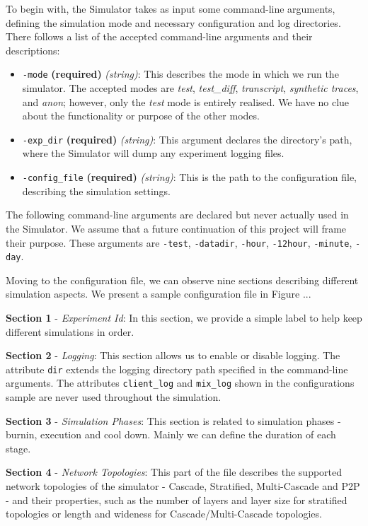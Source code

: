 \documentclass[logo,msc,cyber]{infthesis}   %
\begin{document}
To begin with, the Simulator takes as input some command-line arguments,
defining the simulation mode and necessary configuration and log directories.
There follows a list of the accepted command-line arguments and their
descriptions:

\begin{itemize}
    \item[] \texttt{-mode} \textbf{(required)} \textit{(string)}: This describes
    the mode in which we run the simulator. The accepted modes are \emph{test},
    \emph{test\_diff}, \emph{transcript}, \emph{synthetic traces}, and
    \emph{anon}; however, only the \emph{test} mode is entirely realised. We have no
    clue about the functionality or purpose of the other modes.
    \item[] \texttt{-exp\_dir} \textbf{(required)} \textit{(string)}: This argument
    declares the directory's path, where the Simulator will dump any experiment
    logging files.
    \item[] \texttt{-config\_file} \textbf{(required)} \textit{(string)}: This is
    the path to the configuration file, describing the simulation settings.
 \end{itemize}

The following command-line arguments are declared but never actually used in the
Simulator. We assume that a future continuation of this project will frame their
purpose. These arguments are \texttt{-test}, \texttt{-datadir}, \texttt{-hour},
\texttt{-12hour}, \texttt{-minute}, \texttt{-day}.

Moving to the configuration file, we can observe nine sections describing
different simulation aspects. We present a sample configuration file in Figure
...

\textbf{Section 1} - \emph{Experiment Id}: In this section, we provide a simple
label to help keep different simulations in order.
    
\textbf{Section 2} - \emph{Logging}: This section allows us to enable or disable
logging. The attribute \texttt{dir} extends the logging directory path specified
in the command-line arguments. The attributes \texttt{client\_log} and
\texttt{mix\_log} shown in the configurations sample are never used throughout
the simulation.

\textbf{Section 3} - \emph{Simulation Phases}:  This section is related to
simulation phases - burnin, execution and cool down. Mainly we can define the
duration of each stage.

\textbf{Section 4} - \emph{Network Topologies}:  This part of the file describes
the supported network topologies of the simulator - Cascade, Stratified,
Multi-Cascade and P2P - and their properties, such as the number of layers and
layer size for stratified topologies or length and wideness for
Cascade/Multi-Cascade topologies.
\end{document}
